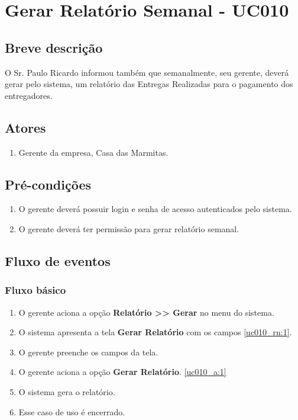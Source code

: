 \chapter{Gerar Relatório Semanal - UC010} \label{uc010}

\section{Breve descrição}

O Sr. Paulo Ricardo informou também que semanalmente, seu gerente, deverá gerar pelo sistema, um relatório das Entregas Realizadas para o pagamento dos entregadores.

\section{Atores}

\begin{enumerate}
	\item Gerente da empresa, Casa das Marmitas.
\end{enumerate}

\section{Pré-condições}

\begin{enumerate}
	\item O gerente deverá possuir login e senha de acesso autenticados pelo sistema.
	\item O gerente deverá ter permissão para gerar relatório semanal.
\end{enumerate}

\section{Fluxo de eventos}

\subsection{Fluxo básico}

\begin{enumerate}[label=P\arabic*]
	\item O gerente aciona a opção \textbf{Relatório >> Gerar} no menu do sistema. \label{uc010_p:1}
	\item O sistema apresenta a tela \textbf{Gerar Relatório} com os campos \ref{uc010_rn:1}.	
	\item O gerente preenche os campos da tela. \label{uc010_p:3}	
	\item O gerente aciona a opção \textbf{Gerar Relatório}. \label{uc010_p:4}\ref{uc010_a:1}	
	\item O sistema gera o relatório.
	\item Esse caso de uso é encerrado.	
\end{enumerate}

